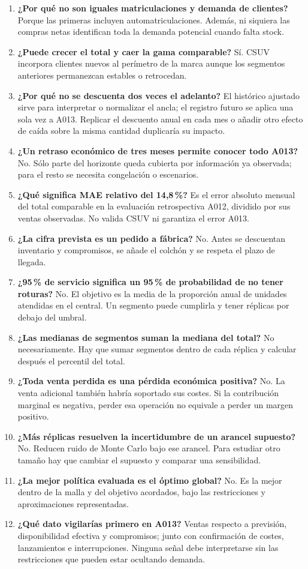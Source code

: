 \begin{enumerate}[itemsep=7pt]
\item \textbf{¿Por qué no son iguales matriculaciones y demanda de clientes?}
Porque las primeras incluyen automatriculaciones. Además, ni siquiera las compras
netas identifican toda la demanda potencial cuando falta stock.
\item \textbf{¿Puede crecer el total y caer la gama comparable?}
Sí. CSUV incorpora clientes nuevos al perímetro de la marca aunque los segmentos
anteriores permanezcan estables o retrocedan.
\item \textbf{¿Por qué no se descuenta dos veces el adelanto?}
El histórico ajustado sirve para interpretar o normalizar el ancla; el registro
futuro se aplica una sola vez a A013. Replicar el descuento anual en cada mes
o añadir otro efecto de caída sobre la misma cantidad duplicaría su impacto.
\item \textbf{¿Un retraso económico de tres meses permite conocer todo A013?}
No. Sólo parte del horizonte queda cubierta por información ya observada; para
el resto se necesita congelación o escenarios.
\item \textbf{¿Qué significa MAE relativo del 14,8\,\%?}
Es el error absoluto mensual del total comparable en la evaluación retrospectiva
A012, dividido por sus ventas observadas. No valida CSUV ni garantiza el error A013.
\item \textbf{¿La cifra prevista es un pedido a fábrica?}
No. Antes se descuentan inventario y compromisos, se añade el colchón y se respeta
el plazo de llegada.
\item \textbf{¿95\,\% de servicio significa un 95\,\% de probabilidad de no tener roturas?}
No. El objetivo es la media de la proporción anual de unidades atendidas en el
central. Un segmento puede cumplirla y tener réplicas por debajo del umbral.
\item \textbf{¿Las medianas de segmentos suman la mediana del total?}
No necesariamente. Hay que sumar segmentos dentro de cada réplica y calcular
después el percentil del total.
\item \textbf{¿Toda venta perdida es una pérdida económica positiva?}
No. La venta adicional también habría soportado sus costes. Si la contribución
marginal es negativa, perder esa operación no equivale a perder un margen positivo.
\item \textbf{¿Más réplicas resuelven la incertidumbre de un arancel supuesto?}
No. Reducen ruido de Monte Carlo bajo ese arancel. Para estudiar otro tamaño
hay que cambiar el supuesto y comparar una sensibilidad.
\item \textbf{¿La mejor política evaluada es el óptimo global?}
No. Es la mejor dentro de la malla y del objetivo acordados, bajo las restricciones
y aproximaciones representadas.
\item \textbf{¿Qué dato vigilarías primero en A013?}
Ventas respecto a previsión, disponibilidad efectiva y compromisos; junto con
confirmación de costes, lanzamientos e interrupciones. Ninguna señal debe
interpretarse sin las restricciones que pueden estar ocultando demanda.
\end{enumerate}
